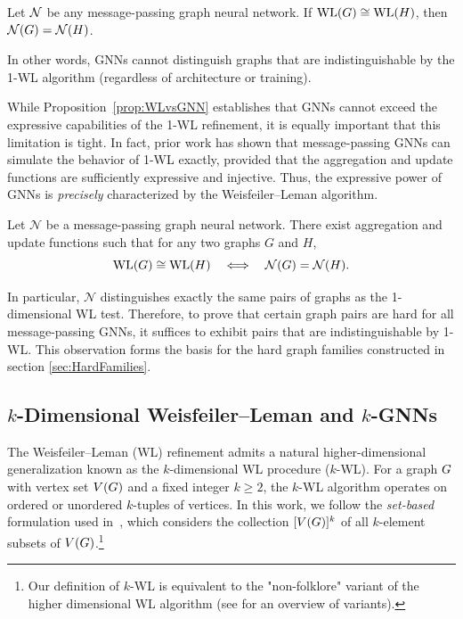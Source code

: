\begin{proposition}
\label{prop:WLvsGNN}
Let $\mathcal{N}$ be any message-passing graph neural network. If $\mathrm{WL}(G) \cong \mathrm{WL}(H)$, then
$\mathcal{N}(G) = \mathcal{N}(H)$.


\end{proposition}

In other words, GNNs cannot distinguish graphs that are indistinguishable by the 1-WL algorithm (regardless of architecture or training).

While Proposition~\ref{prop:WLvsGNN} establishes that GNNs cannot exceed the expressive
capabilities of the 1-WL refinement, it is equally important that this limitation is tight.
In fact, prior work has shown that message-passing GNNs can simulate the behavior of 1-WL
exactly, provided that the aggregation and update functions are sufficiently expressive and
injective. Thus, the expressive power of GNNs is
\emph{precisely} characterized by the Weisfeiler--Leman algorithm.

\begin{proposition} 
\label{prop:GNN-iff-WL}
Let $\mathcal{N}$ be a message-passing graph neural network. There exist aggregation and update functions such that for any two graphs $G$ and $H$,
\[
\mathrm{WL}(G) \cong \mathrm{WL}(H)
\quad\Longleftrightarrow\quad
\mathcal{N}(G) = \mathcal{N}(H).
\]
\end{proposition}
In particular, $\mathcal{N}$ distinguishes exactly the same pairs of graphs as the 1-dimensional WL test.
\noindent
Therefore, to prove that certain graph pairs are hard for all message-passing GNNs, it suffices
to exhibit pairs that are indistinguishable by 1-WL. This observation forms the basis for the
hard graph families constructed in section \ref{sec:HardFamilies}.


\subsection{$k$-Dimensional Weisfeiler--Leman and $k$-GNNs}

The Weisfeiler--Leman (WL) refinement admits a natural higher-dimensional generalization known as the $k$-dimensional WL procedure ($k$-WL). For a graph $G$ with vertex set $V(G)$ and a fixed integer $k \ge 2$, the $k$-WL algorithm operates on ordered or unordered $k$-tuples of vertices. In this work, we follow the \emph{set-based} formulation used in~\citep{MorrisEtAl2019}, which considers the collection $[V(G)]^k$ of all $k$-element subsets of $V(G)$.\footnote{Our definition of $k$-WL is equivalent to the "non-folklore" variant of the higher dimensional WL algorithm (see \citep{inproceedings} for an overview of variants).}

